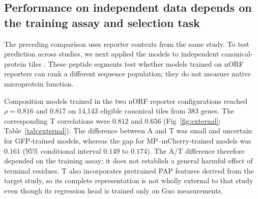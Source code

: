 \documentclass[11pt,a4paper]{article}
\begin{document}
\subsection{Performance on independent data depends on the training assay and selection task}
The preceding comparison uses reporter contexts from the same study.
To test prediction across studies, we next applied the models to independent
canonical-protein tiles \cite{voutsinos}. These peptide segments test whether
models trained on nORF reporters can rank a different sequence population;
they do not measure native microprotein function.

Composition models trained in the two nORF reporter configurations reached
$\rho=0.816$ and $0.817$ on 14,143 eligible canonical tiles from 383 genes.
The corresponding T correlations were $0.812$ and $0.656$
(Fig~\ref{fig:external}; Table~\ref{tab:external}).
The difference between A and T was small and uncertain for GFP-trained models, whereas the gap for MP--mCherry-trained models was $0.161$ (95\% conditional interval $0.149$ to
$0.174$). The A/T difference therefore depended on the training assay; it does not establish a general harmful effect of terminal residues. T also incorporates pretrained PAP features derived from the target study, so its complete representation is not wholly external to that study even though its regression head is trained only on Guo measurements.
\end{document}
